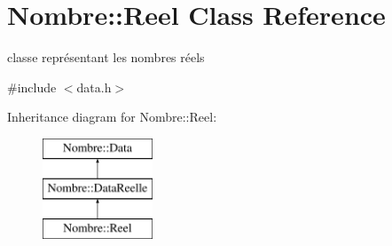 \hypertarget{classNombre_1_1Reel}{
\section{Nombre::Reel Class Reference}
\label{classNombre_1_1Reel}
}


classe représentant les nombres réels  




{\ttfamily \#include $<$data.h$>$}

Inheritance diagram for Nombre::Reel:\begin{figure}[H]
\begin{center}
\leavevmode
\includegraphics[height=3cm]{classNombre_1_1Reel}
\end{center}
\end{figure}
